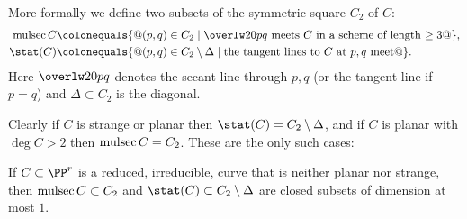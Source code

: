 More formally we define two subsets of the symmetric square $C_2$ of $C$:
%
%
$$
\begin{aligned}
 \mult(C) &\colonequals \{@(p,q) \in C_2 \mid \overlw20{pq} \hbox{ meets
 $C$ in a scheme of length $\geq 3$}@\},\\
\stat(C) &\colonequals  \{@(p,q) \in C_2\setminus \Delta \mid  \hbox{the
tangent lines to $C$ at $p,q$ meet}
@\}.
\end{aligned}
$$
Here
$\overlw20{pq}$
denotes the secant line through $p,q$ (or the
tangent line if $p=q$) and $\Delta\subset C_2$
is the diagonal.


Clearly if $C$ is strange or planar then $\stat(C) = C_2\setminus \Delta$,
and
if $C$ is
planar with $\deg C>2$ then $\mult(C) = C_2$.
These are the only such cases:

\begin{proposition}\label{mult and stat}
 If $C\subset \PP^r$ is a reduced, irreducible, curve that is neither
 planar nor strange, then $\mult(C)\subset C_2$
 and $\stat(C)\subset C_2\setminus \Delta$ are closed subsets of dimension
at most
 $1$.
\unif
\end{proposition}

